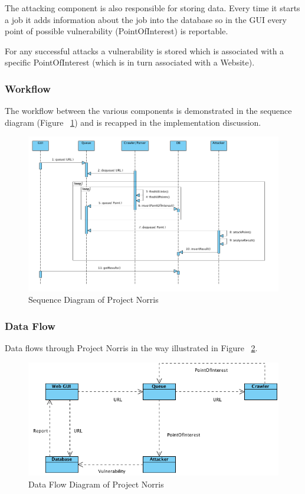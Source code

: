 \documentclass[12pt,a4paper]{article}
\begin{document}
The attacking component is also responsible for storing data.  Every time it starts a job it adds information about the job into the database so in the GUI every point of possible vulnerability (PointOfInterest) is reportable. 

For any successful attacks a vulnerability is stored which is associated with a specific PointOfInterest (which is in turn associated with a Website).

\subsubsection{Workflow}
The workflow between the various components is demonstrated in the sequence diagram (Figure ~\ref{fig:workflow}) and is recapped in the implementation discussion.

\begin{figure}[!ht]
    \begin{center}
        \includegraphics[scale=0.5]{images/system_sequence_diagram.png}    
    \end{center}
    \caption{Sequence Diagram of Project Norris}
    \label{fig:workflow}
\end{figure}

\subsubsection{Data Flow}
Data flows through Project Norris in the way illustrated in Figure ~\ref{fig:dataflow}.

\begin{figure}[!ht]
    \begin{center}
        \includegraphics[scale=0.5]{images/data_flow_diagram.png}    
    \end{center}
    \caption{Data Flow Diagram of Project Norris}
    \label{fig:dataflow}
\end{figure}
\end{document}
